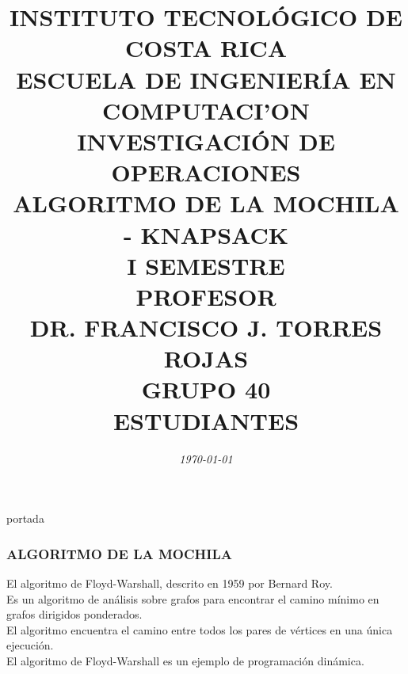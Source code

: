 \documentclass[10]{beamer}
\title{{\color{WHITE} \large \textbf{INSTITUTO TECNOL\'OGICO DE COSTA RICA}} \\ \vspace{0.02cm} 
{\color{WHITE} \large \textbf{ESCUELA DE INGENIER\'IA EN COMPUTACI'ON }} \\ \vspace{0.02cm} 
{\color{WHITE} \large \textbf{INVESTIGACI\'ON DE OPERACIONES  }} \\ \vspace{0.02cm} 
{\color{WHITE} \large \textbf{ALGORITMO DE LA MOCHILA - KNAPSACK  }} \\ \vspace{0.02cm} 
{\color{WHITE} \large \textbf{I SEMESTRE  }}\\ \vspace{0.02cm}
{\color{WHITE} \large \textbf{PROFESOR}} \\ \vspace{0.02cm}
{\color{WHITE} \large DR. FRANCISCO J. TORRES ROJAS  } \\ \vspace{0.02cm}
{\color{WHITE} \large \textbf{GRUPO 40}} \\ \vspace{0.01cm}
{\color{WHITE} \large \textbf{ESTUDIANTES} }}
\date{\em \color{WHITE} \today}
\begin{document}
\begin{frame}
\color{white}
\titlepage portada
\end{frame} 
\begin{frame}
\color{white}
\frametitle{ALGORITMO DE LA MOCHILA}
El algoritmo de Floyd-Warshall, descrito en 1959 por Bernard Roy.
\\Es un algoritmo de an\'alisis sobre grafos para encontrar el camino m\'inimo en grafos dirigidos ponderados.
\\El algoritmo encuentra el camino entre todos los pares de v\'ertices en una \'unica ejecuci\'on.
\\ El algoritmo de Floyd-Warshall es un ejemplo de programaci\'on din\'amica.
\end{frame} 
\end{document}
